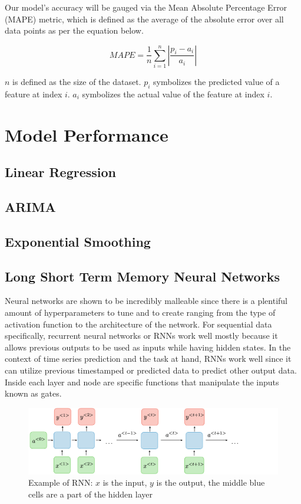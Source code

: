 \documentclass[sigconf,nonacm]{acmart}
\begin{document}
Our model's accuracy will be gauged via the Mean Absolute Percentage Error
(MAPE) metric, which is defined as the average of the absolute error over all
data points as per the equation below. 

$$MAPE = \frac{1}{n} \sum_{i = 1}^{n} |\frac{p_i - a_i}{a_i} |$$

$n$ is defined as the size of the dataset. $p_i$ symbolizes the predicted value
of a feature at index $i$. $a_i$ symbolizes the actual value of the feature at
index $i$.


\section{Model Performance}
\subsection{Linear Regression}
\subsection{ARIMA}
\subsection{Exponential Smoothing}
\subsection{Long Short Term Memory Neural Networks}

Neural networks are shown to be incredibly malleable since there is a plentiful
amount of hyperparameters to tune and to create ranging from the type of
activation function to the architecture of the network. For sequential data
specifically, recurrent neural networks or RNNs work well mostly because it
allows previous outputs to be used as inputs while having hidden states.  
In the context of time series prediction and the task at hand, RNNs work well
since it can utilize previous timestamped or predicted data to predict other
output data. Inside each layer and node are specific functions that manipulate
the inputs known as gates.

\begin{figure}
  \centering
  \includegraphics[width=\linewidth]{figures/architecture-rnn-ltr.png}
  \caption{Example of RNN: $x$ is the input, $y$ is the output, the middle blue
  cells are a part of the hidden layer}
  \label{fig:rnn}
\end{figure}
\end{document}

